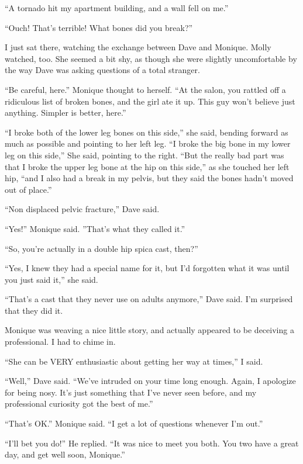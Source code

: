 ``A tornado hit my apartment building, and a wall fell on me.''

``Ouch! That's terrible! What bones did you break?''

I just sat there, watching the exchange between Dave and Monique. Molly watched, too. She
seemed a bit shy, as though she were slightly uncomfortable by the way Dave was asking questions
of a total stranger.

\begin{thought}
``Be careful, here.'' Monique thought to herself. ``At the salon, you rattled off a ridiculous
list of broken bones, and the girl ate it up. This guy won't believe just anything. Simpler is
better, here.''
\end{thought}

``I broke both of the lower leg bones on this side,'' she said, bending forward as much as
possible and pointing to her left leg. ``I broke the big bone in my lower leg on this side,''
She
said, pointing to the right. ``But the really bad part was that I broke the upper leg bone at
the
hip on this side,'' as she touched her left hip, ``and I also had a break in my pelvis, but they
said the bones hadn't moved out of place.''

``Non displaced pelvic fracture,'' Dave said.

``Yes!'' Monique said. ''That's what they called it.''

``So, you're actually in a double hip spica cast, then?''

``Yes, I knew they had a special name for it, but I'd forgotten what it was until you just
said it,'' she said.

``That's a cast that they never use on adults anymore,'' Dave said. I'm surprised that they
did it.

Monique was weaving a nice little story, and actually appeared to be deceiving a
professional. I had to chime in.

``She can be VERY enthusiastic about getting her way at times,'' I said.

``Well,'' Dave said. ``We've intruded on your time long enough. Again, I apologize for being
nosy. It's just something that I've never seen before, and my professional curiosity got the
best of me.''

``That's OK.'' Monique said. ``I get a lot of questions whenever I'm out.''

``I'll bet you do!'' He replied. ``It was nice to meet you both. You two have a great day, and
get well soon, Monique.''

